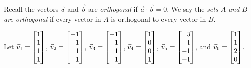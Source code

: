 		Recall the vectors $\vec a$ and $\vec b$ are \emph{orthogonal} if $\vec a\cdot \vec b=0$.
		We say the \emph{sets $A$ and $B$ are orthogonal} if every vector in $A$ is orthogonal to every
		vector in $B$.

		
Let $\vec v_1=\mat{1\\1\\1\\1}$,
		$\vec v_2=\mat{-1\\1\\1\\1}$,
		$\vec v_3=\mat{-1\\-1\\1\\1}$,
		$\vec v_4=\mat{1\\0\\0\\1}$,
		$\vec v_5=\mat{3\\-1\\-1\\-1}$, and
		$\vec v_6=\mat{1\\1\\2\\0}$.

